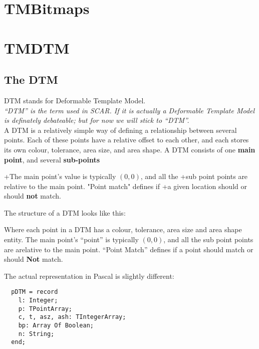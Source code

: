 \documentclass[a4paper, 10pt]{report} %
\begin{document}


\section{TMBitmaps}

\section{TMDTM}

\subsection{The DTM}

DTM stands for Deformable Template Model. \\

\emph{``DTM'' is the term used in SCAR. If it is actually a Deformable Template
Model is definately debateable; but for now we will stick to ``DTM''.} \\

A DTM is a relatively simple way of defining a relationship between several
points. Each of these points have a relative offset to each other, and each 
stores its own colour, tolerance, area size, and area shape. A DTM consists
of one \textbf{main point}, and several \textbf{sub-points}

+The main point's value is typically $ (0, 0) $, and all the
+sub point points are relative to the main point. "Point match" defines if
+a given location should or should \textbf{not} match.

The structure of a DTM looks like this:


Where each point in a DTM has a colour, tolerance, area size and area shape
entity. The main point's ``point'' is typically $ (0, 0) $, and all the
sub point points are arelative to the main point. ``Point Match'' defines
 if a point should match or should \textbf{Not} match.

The actual representation in Pascal is slightly different:


\begin{verbatim}
  pDTM = record
    l: Integer;
    p: TPointArray;
    c, t, asz, ash: TIntegerArray;
    bp: Array Of Boolean;
    n: String;
  end;
\end{verbatim}
\end{document}
